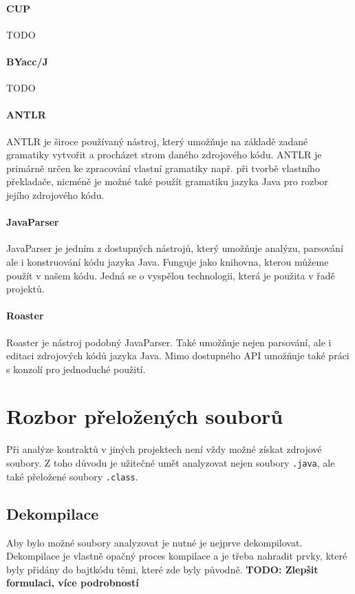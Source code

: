 			\paragraph{CUP}
				TODO
			
			\paragraph{BYacc/J}
				TODO
			
			\paragraph{ANTLR}			
				ANTLR \cite{antlr} je široce používaný nástroj, který umožňuje na základě zadané gramatiky vytvořit a procházet strom daného zdrojového kódu. ANTLR je primárně určen ke zpracování vlastní gramatiky např. při tvorbě vlastního překladače, nicméně je možné také použít gramatiku jazyka Java pro rozbor jejího zdrojového kódu.
			
			\paragraph{JavaParser}
				JavaParser \cite{javaparser} je jedním z dostupných nástrojů, který umožňuje analýzu, parsování ale i konstruování kódu jazyka Java. Funguje jako knihovna, kterou můžeme použít v našem kódu. Jedná se o vyspělou technologii, která je použita v řadě projektů. 
				
			\paragraph{Roaster}
				Roaster \cite{roaster} je nástroj podobný JavaParser. Také umožňuje nejen parsování, ale i editaci zdrojových kódů jazyka Java. Mimo dostupného API umožňuje také práci s konzolí  pro jednoduché použití.
	
	
	\section{Rozbor přeložených souborů}
		Při analýze kontraktů v jiných projektech není vždy možné získat zdrojové soubory. Z toho důvodu je užitečné umět analyzovat nejen soubory \texttt{.java}, ale také přeložené soubory \texttt{.class}.
	
		\subsection{Dekompilace}
			Aby bylo možné soubory analyzovat je nutné je nejprve dekompilovat. Dekompilace je vlastně opačný proces kompilace a je třeba nahradit prvky, které byly přidány do bajtkódu těmi, které zde byly původně. \textbf{\textcolor{pblue}{TODO: Zlepšit formulaci, více podrobností}}\\
			
